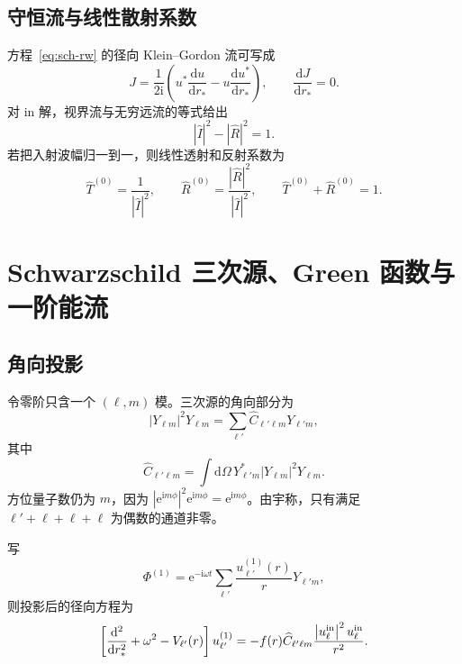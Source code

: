 \documentclass[UTF8,fontset=fandol,11pt,a4paper,oneside]{ctexart}
\numberwithin{equation}{section}
\newcommand{\dd}{\mathrm d}
\newcommand{\ii}{\mathrm i}
\newcommand{\ee}{\mathrm e}
\newcommand{\abs}[1]{\left|#1\right|}
\begin{document}
\subsection{守恒流与线性散射系数}

方程~\eqref{eq:sch-rw} 的径向 Klein--Gordon 流可写成
\begin{equation}
J=\frac{1}{2\ii}
\left(u^*\frac{\dd u}{\dd r_*}
-u\frac{\dd u^*}{\dd r_*}\right),
\qquad \frac{\dd J}{\dd r_*}=0.
\end{equation}
对 in 解，视界流与无穷远流的等式给出
\begin{equation}
\abs{\widehat I}^2-\abs{\widehat R}^2=1.
\end{equation}
若把入射波幅归一到一，则线性透射和反射系数为
\begin{equation}
\boxed{
\widehat T^{(0)}=\frac{1}{\abs{\widehat I}^2},\qquad
\widehat R^{(0)}=\frac{\abs{\widehat R}^2}{\abs{\widehat I}^2},\qquad
\widehat T^{(0)}+\widehat R^{(0)}=1.}
\label{eq:sch-linear-flux}
\end{equation}

\section{Schwarzschild 三次源、Green 函数与一阶能流}
\label{sec:sch-nonlinear}

\subsection{角向投影}

令零阶只含一个 $(\ell,\allowbreak m)$ 模。三次源的角向部分为
\begin{equation}
\abs{Y_{\ell m}}^2Y_{\ell m}
=\sum_{\ell'}\widehat C_{\ell'\ell m}Y_{\ell'm},
\end{equation}
其中
\begin{equation}
\widehat C_{\ell'\ell m}
=\int\dd\Omega\,Y^*_{\ell'm}
\abs{Y_{\ell m}}^2Y_{\ell m}.
\label{eq:sch-projector}
\end{equation}
方位量子数仍为 $m$，因为 $\abs{\ee^{\ii m\phi}}^2\ee^{\ii m\phi}=\ee^{\ii m\phi}$。由宇称，只有满足 $\ell'+\ell+\ell+\ell$ 为偶数的通道非零。

写
\begin{equation}
\Phi^{(1)}=\ee^{-\ii\omega t}
\sum_{\ell'}\frac{u^{(1)}_{\ell'}(r)}{r}Y_{\ell'm},
\end{equation}
则投影后的径向方程为
\begin{equation}
\left[\frac{\dd^2}{\dd r_*^2}+\omega^2-V_{\ell'}(r)\right]
u^{(1)}_{\ell'}
=-f(r)\widehat C_{\ell'\ell m}
\frac{\abs{u^{\rm in}_{\ell}}^2u^{\rm in}_{\ell}}{r^2}.
\label{eq:sch-inhom}
\end{equation}
\end{document}
